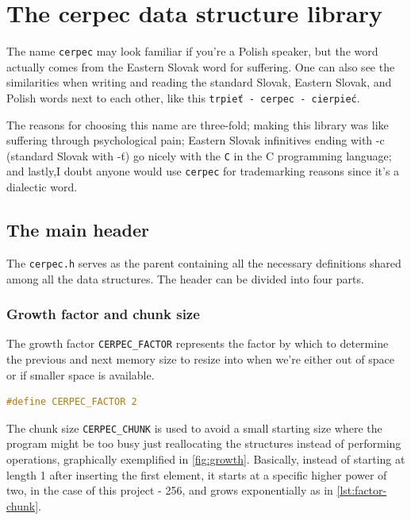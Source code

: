 \chapter{The cerpec data structure library}

The name \texttt{cerpec} may look familiar if you're a Polish speaker, but the word actually comes from the Eastern Slovak word for suffering. One can also see the similarities when writing and reading the standard Slovak, Eastern Slovak, and Polish words next to each other, like this \texttt{trpieť - cerpec - cierpieć}.

The reasons for choosing this name are three-fold; making this library was like suffering through psychological pain; Eastern Slovak infinitives ending with -c (standard Slovak with -ť) go nicely with the \texttt{C} in the C programming language; and lastly,I doubt anyone would use \texttt{cerpec} for trademarking reasons since it's a dialectic word.

\section{The main header}

The \texttt{cerpec.h} serves as the parent containing all the necessary definitions shared among all the data structures. The header can be divided into four parts.

\subsection{Growth factor and chunk size}

The growth factor \texttt{CERPEC\_FACTOR} represents the factor by which to determine the previous and next memory size to resize into when we're either out of space or if smaller space is available. 

\begin{lstlisting}[language=C, style=CodeEditor, label=lst:create-stack, title=include/cerpec.h]
#define CERPEC_FACTOR 2
\end{lstlisting}

The chunk size \texttt{CERPEC\_CHUNK} is used to avoid a small starting size where the program might be too busy just reallocating the structures instead of performing operations, graphically exemplified in \autoref{fig:growth}. Basically, instead of starting at length 1 after inserting the first element, it starts at a specific higher power of two, in the case of this project - 256, and grows exponentially as in \autoref{lst:factor-chunk}.

